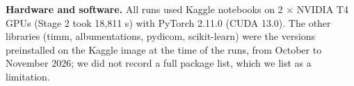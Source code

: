 \textbf{Hardware and software.} All runs used Kaggle notebooks on 2 $\times$ NVIDIA T4 GPUs (Stage 2 took 18,811 s) with PyTorch 2.11.0 (CUDA 13.0). The other libraries (timm, albumentations, pydicom, scikit-learn) were the versions preinstalled on the Kaggle image at the time of the runs, from October to November 2026; we did not record a full package list, which we list as a limitation.


